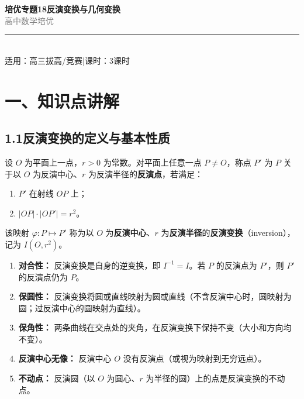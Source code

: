 \documentclass[12pt, a4paper]{ctexart}
\begin{document}
\begin{center}
{\Huge\bfseries\textcolor{mainblue}{培优专题18\quad 反演变换与几何变换}}\\[12pt]
{\Large\textcolor{gray}{高\;中\;数\;学\;培\;优}}\\[8pt]
\rule{0.6\textwidth}{1pt}\\[8pt]
{\normalsize 适用：高三拔高/竞赛\quad |\quad 课时：3课时}
\end{center}
\vspace{10pt}

\section*{\textcolor{mainblue}{一、知识点讲解}}

\subsection*{1.1\quad 反演变换的定义与基本性质}

\begin{knowledgebox}[反演变换的定义]
设 $O$ 为平面上一点，$r > 0$ 为常数。对平面上任意一点 $P \neq O$，称点 $P'$ 为 $P$ 关于以 $O$ 为反演中心、$r$ 为反演半径的\textbf{反演点}，若满足：
\begin{enumerate}[label=(\arabic*)]
  \item $P'$ 在射线 $OP$ 上；
  \item $|OP| \cdot |OP'| = r^2$。
\end{enumerate}
该映射 $\varphi: P \mapsto P'$ 称为以 $O$ 为\textbf{反演中心}、$r$ 为\textbf{反演半径}的\textbf{反演变换}（inversion），记为 $I(O, r^2)$。
\end{knowledgebox}

\begin{tipbox}[反演变换的基本性质]
\begin{enumerate}[label=(\arabic*)]
  \item \textbf{对合性：} 反演变换是自身的逆变换，即 $I^{-1} = I$。若 $P$ 的反演点为 $P'$，则 $P'$ 的反演点仍为 $P$。
  \item \textbf{保圆性：} 反演变换将圆或直线映射为圆或直线（不含反演中心时，圆映射为圆；过反演中心的圆映射为直线）。
  \item \textbf{保角性：} 两条曲线在交点处的夹角，在反演变换下保持不变（大小和方向均不变）。
  \item \textbf{反演中心无像：} 反演中心 $O$ 没有反演点（或视为映射到无穷远点）。
  \item \textbf{不动点：} 反演圆（以 $O$ 为圆心、$r$ 为半径的圆）上的点是反演变换的不动点。
\end{enumerate}
\end{tipbox}
\end{document}
